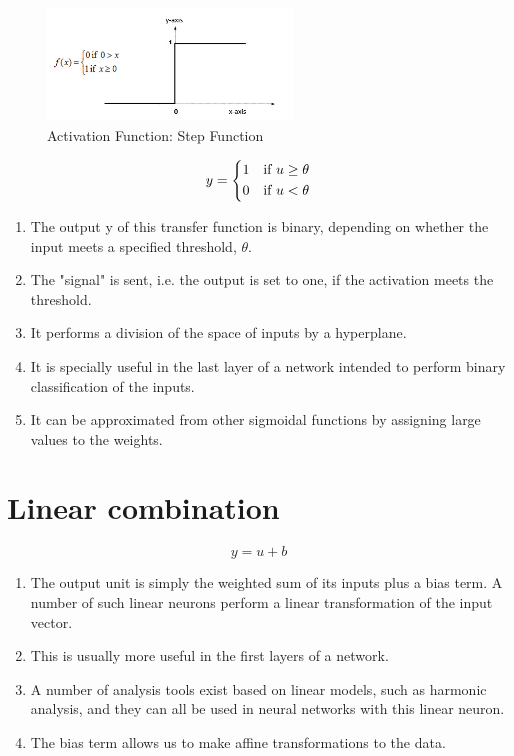 \begin{figure}[H]
    \centering
    \includegraphics[height=3cm]{Pictures/activation-fns/step-function.jpg}
    \caption{Activation Function: Step Function}
\end{figure}

\[
    y={\begin{dcases}1&{\text{if }}u\geq \theta \\0&{\text{if }}u<\theta \end{dcases}}
\]

\begin{enumerate}
    \item The output y of this transfer function is binary, depending on whether the input meets a specified threshold, $\theta$. 
    \item The "signal" is sent, i.e. the output is set to one, if the activation meets the threshold.
    \item It performs a division of the space of inputs by a hyperplane. 
    \item It is specially useful in the last layer of a network intended to perform binary classification of the inputs. 
    \item It can be approximated from other sigmoidal functions by assigning large values to the weights.
\end{enumerate}


\section{Linear combination \cite{wiki-Artificial_neuron}}
\[
    y = u + b
\]

\begin{enumerate}
    \item The output unit is simply the weighted sum of its inputs plus a bias term. A number of such linear neurons perform a linear transformation of the input vector. 
    \item This is usually more useful in the first layers of a network. 
    \item A number of analysis tools exist based on linear models, such as harmonic analysis, and they can all be used in neural networks with this linear neuron. 
    \item The bias term allows us to make affine transformations to the data.
\end{enumerate}



